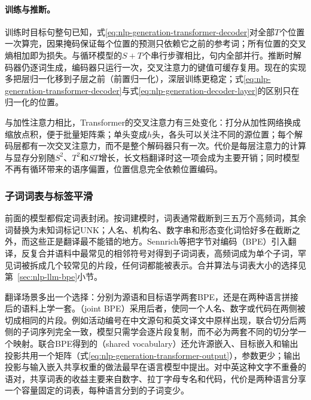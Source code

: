 \paragraph{训练与推断。}训练时目标句整句已知，式\eqref{eq:nlp-generation-transformer-decoder}对全部$T$个位置一次算完，因果掩码保证每个位置的预测只依赖它之前的参考词；所有位置的交叉熵相加即为损失。与循环模型的$S+T$个串行步骤相比，句内全部并行。推断时解码器仍逐词生成，编码器只运行一次，交叉注意力的键值可缓存复用。现在的实现多把层归一化移到子层之前（前置归一化），深层训练更稳定；式\eqref{eq:nlp-generation-transformer-decoder}与式\eqref{eq:nlp-generation-decoder-layer}的区别只在归一化的位置。

与加性注意力相比，Transformer的交叉注意力有三处变化：打分从加性网络换成缩放点积，便于批量矩阵乘；单头变成$h$头，各头可以关注不同的源位置；每个解码层都有一次交叉注意力，而不是整个解码器只有一次。代价是每层注意力的计算与显存分别随$S^2$、$T^2$和$ST$增长，长文档翻译时这一项会成为主要开销；同时模型不再有循环带来的语序偏置，位置信息完全依赖位置编码。

\subsubsection{子词词表与标签平滑}
\label{sec:nlp-generation-subword-label-smoothing}

前面的模型都假定词表封闭。按词建模时，词表通常截断到三五万个高频词，其余词替换为未知词标记UNK；人名、机构名、数字串和形态变化词恰好多在截断之外，而这些正是翻译最不能错的地方。Sennrich等把字节对编码（BPE）引入翻译，反复合并语料中最常见的相邻符号对得到子词词表，高频词成为单个子词，罕见词被拆成几个较常见的片段，任何词都能被表示。合并算法与词表大小的选择见第~\ref{sec:nlp-llm-bpe}小节。

翻译场景多出一个选择：分别为源语和目标语学两套BPE，还是在两种语言拼接后的语料上学一套。（joint BPE）采用后者，使同一个人名、数字或代码在两侧被切成相同的片段。例如活动编号在中文源句和英文译文中原样出现，联合切分后两侧的子词序列完全一致，模型只需学会逐片段复制，而不必为两套不同的切分学一个映射。联合BPE得到的（shared vocabulary）还允许源嵌入、目标嵌入和输出投影共用一个矩阵（式\eqref{eq:nlp-generation-transformer-output}），参数更少；输出投影与输入嵌入共享权重的做法最早在语言模型中提出。对中英这种文字不重叠的语对，共享词表的收益主要来自数字、拉丁字母专名和代码，代价是两种语言分享一个容量固定的词表，每种语言分到的子词变少。

